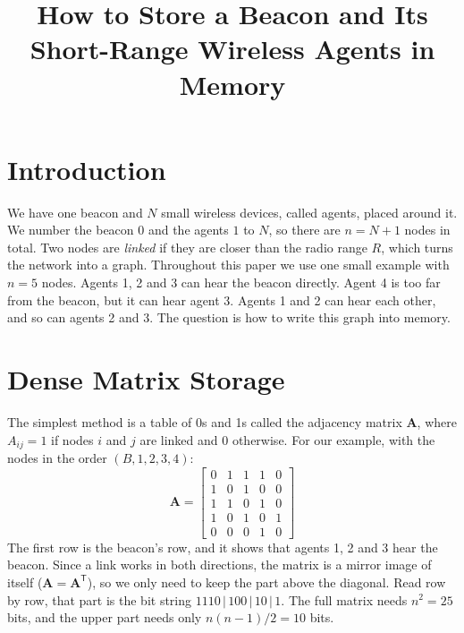\documentclass[conference]{IEEEtran}
\begin{document}
\title{How to Store a Beacon and Its Short-Range Wireless Agents in Memory}

\author{
}

\maketitle
\IEEEpeerreviewmaketitle

\section{Introduction}

We have one beacon and $N$ small wireless devices, called agents, placed around it. We number the beacon $0$ and the agents $1$ to $N$, so there are $n=N+1$ nodes in total. Two nodes are \emph{linked} if they are closer than the radio range $R$, which turns the network into a graph. Throughout this paper we use one small example with $n=5$ nodes. Agents 1, 2 and 3 can hear the beacon directly. Agent 4 is too far from the beacon, but it can hear agent 3. Agents 1 and 2 can hear each other, and so can agents 2 and 3. The question is how to write this graph into memory.

\section{Dense Matrix Storage}

The simplest method is a table of 0s and 1s called the adjacency matrix $\mathbf{A}$, where $A_{ij}=1$ if nodes $i$ and $j$ are linked and $0$ otherwise. For our example, with the nodes in the order $(B,1,2,3,4)$:
\begin{equation}
\mathbf{A}=
\begin{bmatrix}
0&1&1&1&0\\
1&0&1&0&0\\
1&1&0&1&0\\
1&0&1&0&1\\
0&0&0&1&0
\end{bmatrix}
\end{equation}
The first row is the beacon's row, and it shows that agents 1, 2 and 3 hear the beacon. Since a link works in both directions, the matrix is a mirror image of itself ($\mathbf{A}=\mathbf{A}^{\mathsf T}$), so we only need to keep the part above the diagonal. Read row by row, that part is the bit string $1110\,|\,100\,|\,10\,|\,1$. The full matrix needs $n^2=25$ bits, and the upper part needs only $n(n-1)/2=10$ bits.
\end{document}
